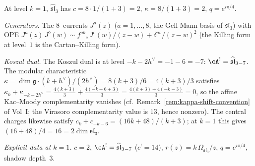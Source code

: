 \begin{computation}[Affine $\widehat{\mathfrak{sl}}_3$ at $k=1$:
explicit holographic quantisation; \ClaimStatusProvedHere]
At level $k=1$, $\widehat{\mathfrak{sl}}_3$ has
$c=8\cdot 1/(1+3)=2$,
$\kappa=8/(1+3)=2$,
$q=e^{i\pi/4}$.

\emph{Generators.}
The $8$~currents $J^a(z)$ ($a=1,\dots,8$, the Gell-Mann
basis of $\mathfrak{sl}_3$) with OPE
$J^a(z)\,J^b(w)\sim
f^{ab}{}_c\,J^c(w)/(z-w)
+\delta^{ab}/(z-w)^2$
(the Killing form at level~$1$ is the Cartan--Killing form).

\emph{Koszul dual.}
The Koszul dual is at level $-k-2h^\vee=-1-6=-7$:
$\cA^!=\widehat{\mathfrak{sl}}_3{}_{-7}$.
The modular characteristic $\kappa=\dim\mathfrak g\cdot(k+h^\vee)/(2h^\vee)
=8(k+3)/6=4(k+3)/3$ satisfies
$\kappa_k+\kappa_{-k-2h^\vee}
=\frac{4(k+3)}{3}+\frac{4(-k-6+3)}{3}
=\frac{4(k+3)+4(-k-3)}{3}
=0$,
so the affine Kac--Moody complementarity vanishes
(cf.\ Remark~\ref*{rem:kappa-shift-convention}
of Vol~I; the Virasoro complementarity value is $13$, hence
nonzero). The central charges likewise satisfy
$c_k+c_{-k-6}=(16k+48)/(k+3)$; at $k=1$ this gives
$(16+48)/4=16=2\dim\mathfrak{sl}_3$.

\emph{Explicit data at $k=1$.}
$c=2$, $\cA^!=\widehat{\mathfrak{sl}}_3{}_{-7}$ ($c^!=14$),
$r(z)=k\,\Omega_{\mathfrak{sl}_3}/z$,
$q=e^{i\pi/4}$, shadow depth~$3$.
\end{computation}

